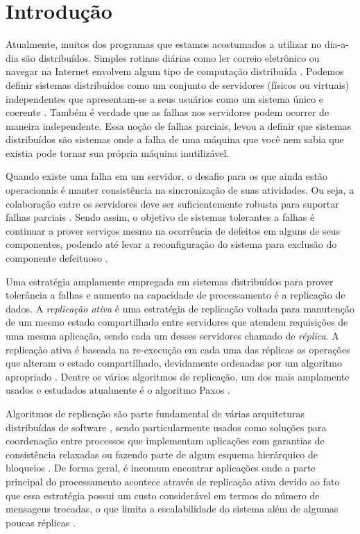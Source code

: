 \chapter*[Introdução]{Introdução}

Atualmente, muitos dos programas que estamos acostumados a utilizar no dia-a-dia são
distribuídos. Simples rotinas diárias como ler correio eletrônico ou navegar na Internet
envolvem algum tipo de computação distribuída \cite{cachin11}. Podemos definir sistemas
distribuídos como um conjunto de servidores (físicos ou virtuais) independentes que
apresentam-se a seus usuários como um sistema único e coerente \cite{tanenbaum07}. Também
é verdade que as falhas nos servidores podem ocorrer de maneira independente. Essa noção
de falhas parciais, levou  a definir que sistemas distribuídos são
sistemas onde a falha de uma máquina que você nem sabia que existia pode tornar sua
própria máquina inutilizável.

Quando existe uma falha em um servidor, o desafio para os que ainda estão operacionais é
manter consistência na sincronização de suas atividades. Ou seja, a colaboração entre os
servidores deve ser suficientemente robusta para suportar falhas parciais \cite{cachin11}.
Sendo assim, o objetivo de sistemas tolerantes a falhas é continuar a prover serviços
mesmo na ocorrência de defeitos em alguns de seus componentes, podendo até levar a
reconfiguração do sistema para exclusão do componente defeituoso \cite{tanenbaum07}.

Uma estratégia amplamente empregada em sistemas distribuídos para prover tolerância a
falhas e aumento na capacidade de processamento é a replicação de dados. A
\emph{replicação ativa} \cite{schneider90} é uma estratégia de replicação voltada para
manutenção de um mesmo estado compartilhado entre servidores que atendem requisições de
uma mesma aplicação, sendo cada um desses servidores chamado de \emph{réplica}. A
replicação ativa é baseada na re-execução em cada uma das réplicas as operações que
alteram o estado compartilhado, devidamente ordenadas por um algoritmo apropriado
\cite{schneider90}. Dentre os vários algoritmos de replicação, um dos mais amplamente
usados e estudados atualmente é o algoritmo Paxos \cite{lamport98}.

Algoritmos de replicação são parte fundamental de várias arquiteturas distribuídas de
software \cite{chandra07, hupfeld08b, maccormick04}, sendo particularmente usados como
soluções para coordenação entre processos que implementam aplicações com garantias de
consistência relaxadas \cite{burrows06} ou fazendo parte de algum esquema hierárquico de
bloqueios \cite{lampson96}. De forma geral, é incomum encontrar aplicações onde a parte
principal do processamento acontece através de replicação ativa devido ao fato que essa
estratégia possui um custo considerável em termos do número de mensagens trocadas, o que
limita a escalabilidade do sistema além de algumas poucas réplicas \cite{lampson96}.

